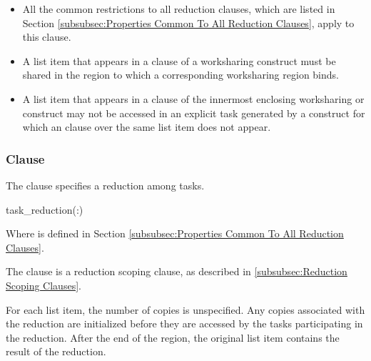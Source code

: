 \begin{itemize}
\item All the common restrictions to all reduction clauses, which are listed in
Section \ref{subsubsec:Properties Common To All Reduction Clauses}, apply to
this clause.

\item A list item that appears in a  clause of a worksharing
construct must be shared in the  region to which a corresponding
worksharing region binds.

\item A list item that appears in a  clause of the innermost
enclosing worksharing or  construct may not be accessed in an
explicit task generated by a construct for which an  clause
over the same list item does not appear.

\end{itemize}










\subsubsection{ Clause}
\label{subsubsec:task_reduction clause}
\summary
The  clause specifies a reduction among tasks.

\syntax
\begin{ompSyntax}
task_reduction(:)
\end{ompSyntax}
Where  is defined in Section
\ref{subsubsec:Properties Common To All Reduction Clauses}.

\descr
The  clause is a reduction scoping clause, as described in
\ref{subsubsec:Reduction Scoping Clauses}.

For each list item, the number of copies is unspecified. Any copies associated
with the reduction are initialized before they are accessed by the tasks
participating in the reduction. After the end of the region, the original list
item contains the result of the reduction.

